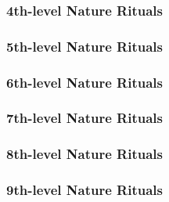 \subsubsection{4th-level Nature Rituals}
\begin{rituallist}
    \SLreincarnate
    \SLtongues
\end{rituallist}

\subsubsection{5th-level Nature Rituals}
\begin{rituallist}
    \SLatonement
    \SLcommunewithnature
    \SLdream
    \SLdream
    \SLfabricate
    \SLpasswall
    \SLscrying
    \SLtreestride
\end{rituallist}

\subsubsection{6th-level Nature Rituals}
\begin{rituallist}
    \SLfindthepath
    \SLmoveearth
    \SLtransportviaplants
\end{rituallist}

\subsubsection{7th-level Nature Rituals}
\begin{rituallist}
    \SLawaken
    \SLcontrolweather
\end{rituallist}

\subsubsection{8th-level Nature Rituals}
\begin{rituallist}
    \SLdiscernlocation
\end{rituallist}

\subsubsection{9th-level Nature Rituals}
\begin{rituallist}
    \SLantipathy
    \SLsympathy
\end{rituallist}
